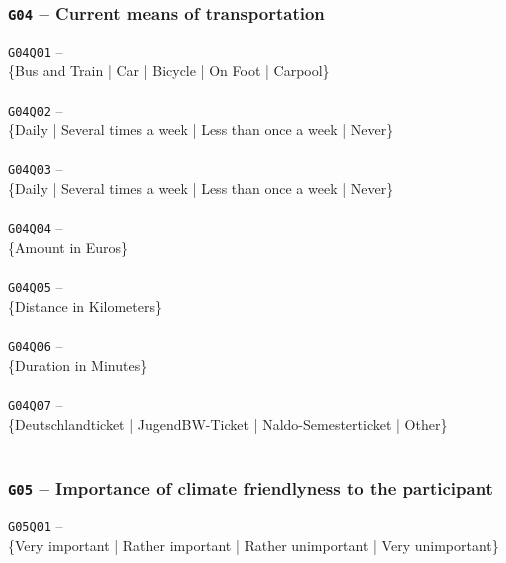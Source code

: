 \subsubsection{\texttt{G04} -- Current means of transportation}
\begin{displayquote}
    \texttt{G04Q01} -- \\
    \{Bus and Train | Car | Bicycle | On Foot | Carpool\}\\\\
    \texttt{G04Q02} -- \\
    \{Daily | Several times a week | Less than once a week | Never\}\\\\
    \texttt{G04Q03} -- \\
    \{Daily | Several times a week | Less than once a week | Never\}\\\\
    \texttt{G04Q04} -- \\
    \{Amount in Euros\}\\\\
    \texttt{G04Q05} -- \\
    \{Distance in Kilometers\}\\\\
    \texttt{G04Q06} -- \\
    \{Duration in Minutes\}\\\\
    \texttt{G04Q07} -- \\
    \{Deutschlandticket | JugendBW-Ticket | Naldo-Semesterticket | Other\}\\\\
\end{displayquote}

\subsubsection{\texttt{G05} -- Importance of climate friendlyness to the participant}
\begin{displayquote}
    \texttt{G05Q01} -- \\
    \{Very important | Rather important | Rather unimportant | Very unimportant\}\\\\
\end{displayquote}


